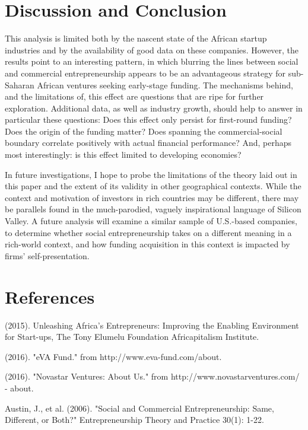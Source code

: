 \documentclass[12pt]{article}
\begin{document}
\FloatBarrier

\section{Discussion and Conclusion}

This analysis is limited both by the nascent state of the African startup industries and by the availability of good data on these companies. However, the results point to an interesting pattern, in which blurring the lines between social and commercial entrepreneurship appears to be an advantageous strategy for sub-Saharan African ventures seeking early-stage funding. The mechanisms behind, and the limitations of, this effect are questions that are ripe for further exploration. Additional data, as well as industry growth, should help to answer in particular these questions: Does this effect only persist for first-round funding? Does the origin of the funding matter? Does spanning the commercial-social boundary correlate positively with actual financial performance? And, perhaps most interestingly: is this effect limited to developing economies?

In future investigations, I hope to probe the limitations of the theory laid out in this paper and the extent of its validity in other geographical contexts. While the context and motivation of investors in rich countries may be different, there may be parallels found in the much-parodied, vaguely inspirational language of Silicon Valley. A future analysis will examine a similar sample of U.S.-based companies, to determine whether social entrepreneurship takes on a different meaning in a rich-world context, and how funding acquisition in this context is impacted by firms' self-presentation.

\section{References}

\begingroup\small

(2015). Unleashing Africa's Entrepreneurs: Improving the Enabling Environment for Start-ups, The Tony Elumelu Foundation Africapitalism Institute.
	
(2016). "eVA Fund." from http://www.eva-fund.com/about.
	
(2016). "Novastar Ventures: About Us." from http://www.novastarventures.com/ - about.
	
Austin, J., et al. (2006). "Social and Commercial Entrepreneurship: Same, Different, or Both?" Entrepreneurship Theory and Practice 30(1): 1-22.
	
\end{document}
